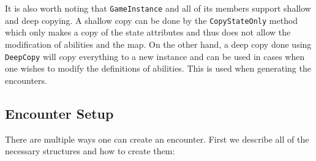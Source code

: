 It is also worth noting that \verb|GameInstance| and all of its members support shallow and deep copying. A shallow copy can be done by the \verb|CopyStateOnly| method which only makes a copy of the state attributes and thus does not allow the modification of abilities and the map. On the other hand, a deep copy done using \verb|DeepCopy| will copy everything to a new instance and can be used in cases when one wishes to modify the definitions of abilities. This is used when generating the encounters.

\subsection{Encounter Setup}

There are multiple ways one can create an encounter. First we describe all of the necessary structures and how to create them:

